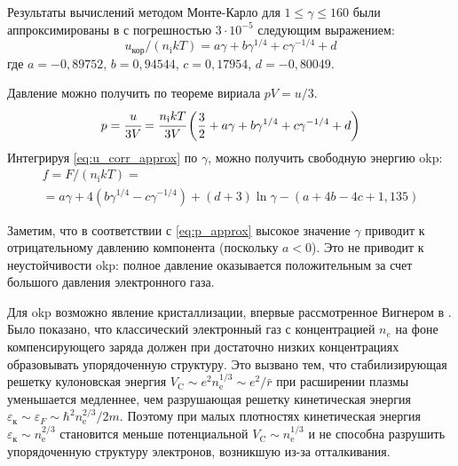 Результаты вычислений методом Монте-Карло для $1 \leq \gamma \leq 160$ были аппроксимированы в \cite{Slattery:u_corr_approximation} с погрешностью $3 \cdot 10^{-5}$ следующим выражением:
\begin{equation}
    \label{eq:u_corr_approx}
    u_{\text{кор}} /\left(n_{\mathrm{i}} k T\right)=a \gamma+b \gamma^{1 / 4}+c \gamma^{-1 / 4}+d
\end{equation}
где $a=-0,89752$, $b=0,94544$, $c=0,17954$, $d=-0,80049$.

Давление можно получить по теореме вириала $p V = u/3$.
\begin{equation}
    \label{eq:p_approx}
    p = \cfrac{u}{3V}
    = \cfrac{n_\mathrm{i} kT}{3V} \left( \frac{3}{2}
    + a \gamma + b \gamma^{1/4} + c \gamma^{-1/4} + d \right)
\end{equation}
Интегрируя \eqref{eq:u_corr_approx} по $\gamma$, можно получить свободную энергию \acrshort{okp}:
\begin{multline}
    \label{eq:f-density-gas-approx}
    f=F /\left(n_{\mathrm{i}} k T\right) = \\
    =a \gamma+4\left(b \gamma^{1 / 4}-c \gamma^{-1 / 4}\right)+(d+3) \ln \gamma-(a+4 b-4 c+1,135)
\end{multline}

Заметим, что в соответствии с \eqref{eq:p_approx} высокое значение $\gamma$ приводит к отрицательному давлению компонента (поскольку $a < 0$).
Это не приводит к неустойчивости \acrshort{okp}: полное давление оказывается положительным за счет большого давления электронного газа.

Для \acrshort{okp} возможно явление кристаллизации, впервые рассмотренное Вигнером в \cite{Wigner:plasma_condensation}.
Было показано, что классический электронный газ с концентрацией $n_e$ на фоне компенсирующего заряда должен при достаточно низких концентрациях образовывать упорядоченную структуру.
Это вызвано тем, что стабилизирующая решетку кулоновская энергия $V_{\mathrm{C}} \sim e^{2} n_{\mathrm{e}}^{1 / 3} \sim e^{2} / \bar{r}$ при расширении плазмы уменьшается медленнее, чем разрушающая решетку кинетическая энергия $\varepsilon_\text{к} \sim \varepsilon_{F} \sim \hbar^{2} n_{\mathrm{e}}^{2 / 3} / 2 m$.
Поэтому при малых плотностях кинетическая энергия $\varepsilon_\text{к} \sim n_{\mathrm{e}}^{2 / 3}$ становится меньше потенциальной $V_{\mathrm{C}} \sim n_{\mathrm{e}}^{1 / 3}$ и не способна разрушить упорядоченную структуру электронов, возникшую из-за отталкивания.

